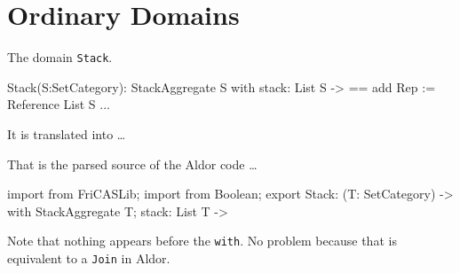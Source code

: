 \documentclass{article}
\begin{document}
\section{Ordinary Domains}\label{sec:Domain}
The domain \verb'Stack'.
\begin{code}
Stack(S:SetCategory): StackAggregate S with
    stack: List S -> %
  == add
    Rep := Reference List S
    ...
\end{code}
It is translated into \ldots
{}
That is the parsed source of the Aldor code \ldots
\begin{code}
import from FriCASLib;
import from Boolean;
export Stack: (T: SetCategory) -> with {
                                        StackAggregate T;
                                        stack: List T -> %
                                  }
\end{code}
Note that nothing appears before the \verb'with'. No problem because
that is equivalent to a \verb'Join' in Aldor.



















\end{document}
